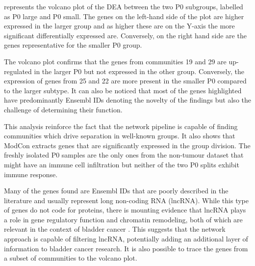  represents the volcano plot of the DEA between the two P0 subgroups, labelled as P0 large and P0 small. The genes on the left-hand side of the plot are higher expressed in the larger group and as higher these are on the Y-axis the more significant differentially expressed are. Conversely, on the right hand side are the genes representative for the smaller P0 group.

The volcano plot confirms that the genes from communities 19 and 29 are up-regulated in the larger P0 but not expressed in the other group. Conversely, the expression of genes from 25 and 22 are more present in the smaller P0 compared to the larger subtype. It can also be noticed that most of the genes highlighted have predominantly Ensembl IDs denoting the novelty of the findings but also the challenge of determining their function. 

This analysis reinforce the fact that the network pipeline is capable of finding communities which drive separation in well-known groups. It also shows that ModCon extracts genes that are significantly expressed in the group division. The freshly isolated P0 samples are the only ones from the non-tumour dataset that might have an immune cell infiltration but neither of the two P0 splits exhibit immune response. 

Many of the genes found are Ensembl IDs that are poorly described in the literature and usually represent long non-coding RNA (lncRNA). While this type of genes do not code for proteins, there is mounting evidence that lncRNA plays a role in gene regulatory function and chromatin remodeling, both of which are relevant in the context of bladder cancer \citep{Statello2021-md}. This suggests that the network approach is capable of filtering lncRNA, potentially adding an additional layer of information to bladder cancer research. It is also possible to trace the genes from a subset of communities to the volcano plot.




